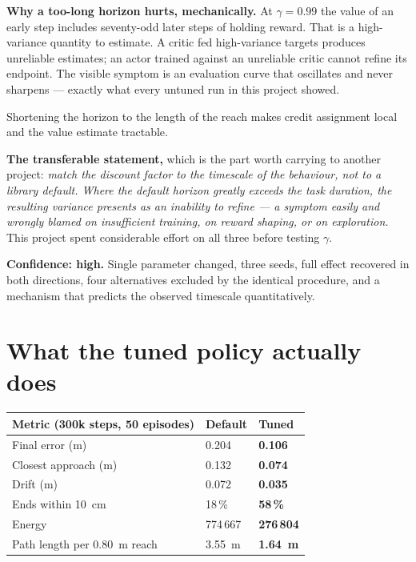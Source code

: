 \begin{why}
\textbf{Why a too-long horizon hurts, mechanically.} At $\gamma = 0.99$ the value
of an early step includes seventy-odd later steps of holding reward. That is a
high-variance quantity to estimate. A critic fed high-variance targets produces
unreliable estimates; an actor trained against an unreliable critic cannot refine
its endpoint. The visible symptom is an evaluation curve that oscillates and
never sharpens --- exactly what every untuned run in this project showed.

Shortening the horizon to the length of the reach makes credit assignment local
and the value estimate tractable.

\textbf{The transferable statement,} which is the part worth carrying to another
project: \emph{match the discount factor to the timescale of the behaviour, not
to a library default. Where the default horizon greatly exceeds the task
duration, the resulting variance presents as an inability to refine --- a symptom
easily and wrongly blamed on insufficient training, on reward shaping, or on
exploration.} This project spent considerable effort on all three before testing
$\gamma$.
\end{why}

\textbf{Confidence: high.} Single parameter changed, three seeds, full effect
recovered in both directions, four alternatives excluded by the identical
procedure, and a mechanism that predicts the observed timescale quantitatively.

\section{What the tuned policy actually does}

\begin{center}
\begin{tabular}{@{} L{5.6cm} C{3.0cm} C{3.0cm} @{}}
\toprule
\textbf{Metric (300k steps, 50 episodes)} & \textbf{Default} & \textbf{Tuned} \\
\midrule
Final error (m) & 0.204 & \textbf{0.106} \\
Closest approach (m) & 0.132 & \textbf{0.074} \\
Drift (m) & 0.072 & \textbf{0.035} \\
Ends within \SI{10}{\centi\meter} & 18\,\% & \textbf{58\,\%} \\
Energy & 774\,667 & \textbf{276\,804} \\
Path length per \SI{0.80}{\meter} reach & \SI{3.55}{\meter} & \textbf{\SI{1.64}{\meter}} \\
\bottomrule
\end{tabular}
\end{center}

